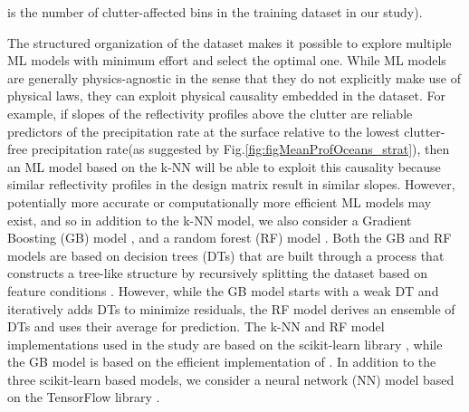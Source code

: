 \documentclass{ametsocV6.1} %
\begin{document}
is the number of clutter-affected bins in the training dataset in our study).


The structured organization of the dataset makes it  possible to explore multiple ML models with minimum effort and select the optimal one. While ML models are generally physics-agnostic in the sense that they do not explicitly make use of physical laws, they can exploit physical causality embedded in the dataset. For example, if slopes of the reflectivity profiles above the clutter are reliable predictors of the precipitation rate at the surface relative to the lowest clutter-free precipitation rate(as suggested by Fig.\ref{fig:figMeanProfOceans_strat}), then an ML model based on the k-NN \citep{friedman2001} will be able to exploit this causality because similar reflectivity profiles in the design matrix result in similar slopes. However, potentially more accurate or computationally more efficient ML models may exist, and so in addition to the k-NN model, we also consider a Gradient Boosting (GB) model \citep{friedman2001}, and a random forest (RF) model \citep{ho1995}.  Both the GB and RF models are based on decision trees (DTs) that are built through a process that constructs a tree-like structure by recursively splitting the dataset based on feature conditions \citep{bishop2006}.  However, while the GB model starts with a weak DT and iteratively adds DTs to minimize residuals, the RF model derives an ensemble of DTs and uses their average for prediction. The k-NN and RF model implementations used in the study are based on the scikit-learn library \citep{pedregosa2011}, while the GB model is based on the efficient implementation of \cite{ke2017}. In addition to the three scikit-learn based models, we consider a neural network (NN) model \citep{deepL2016,geron2022} based on the TensorFlow library \citep{tensorflow2016}.
\end{document}
